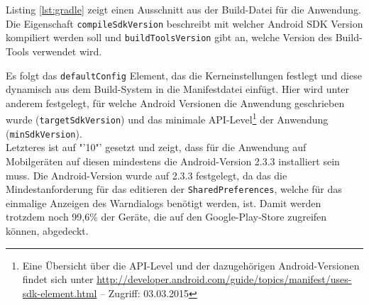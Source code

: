 Listing \ref{lst:gradle} zeigt einen Ausschnitt aus der Build-Datei für die Anwendung. \\
Die Eigenschaft \texttt{compileSdkVersion} beschreibt mit welcher Android \gls{SDK} Version kompiliert werden soll und \texttt{buildToolsVersion} gibt an, welche Version des Build-Tools verwendet wird.
\begin{center}
\grayRule \grayRule
\end{center}
Es folgt das \texttt{defaultConfig} Element, das die Kerneinstellungen festlegt und diese dynamisch aus dem Build-System in die  Manifestdatei einfügt. Hier wird unter anderem festgelegt, für welche Android Versionen die Anwendung geschrieben wurde (\texttt{targetSdkVersion}) und das minimale \gls{API}-Level\footnote{ Eine Übersicht über die \gls{API}-Level und der dazugehörigen Android-Versionen findet sich unter \url{http://developer.android.com/guide/topics/manifest/uses-sdk-element.html} -- Zugriff: 03.03.2015} der Anwendung (\texttt{minSdkVersion}).\\ 
Letzteres ist auf "'10"' gesetzt und zeigt, dass für die Anwendung auf Mobilgeräten auf diesen mindestens die Android-Version 2.3.3 installiert sein muss. 
Die Android-Version wurde auf 2.3.3 festgelegt, da das die Mindestanforderung für das editieren der \texttt{SharedPreferences}, welche für das einmalige Anzeigen des Warndialogs benötigt werden, ist. Damit werden trotzdem noch 99,6\% der Geräte, die auf den Google-Play-Store zugreifen können, abgedeckt. \cite{android_version} 
%
%
\clearpage
